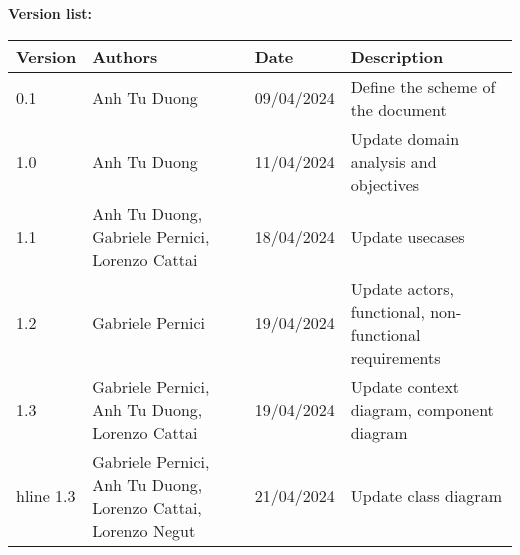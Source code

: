 \textcolor{RFIGreen}{\Large\bf Version list:}


\begin{center}

{\setlength{\extrarowheight}{6pt}
\begin{tabular}{|p{1.5cm}|p{4.5cm}|p{2.5cm}|p{5.5cm}|}
\hline
{\small\bf Version} & {\small\bf Authors} & {\small\bf Date} & {\small\bf Description}\\
\hline
0.1 & Anh Tu Duong & 09/04/2024  & Define the scheme of the document \\
\hline
1.0 & Anh Tu Duong & 11/04/2024  & Update domain analysis and objectives \\
\hline
1.1 & Anh Tu Duong, Gabriele Pernici, Lorenzo Cattai & 18/04/2024  & Update usecases \\
\hline
1.2 & Gabriele Pernici & 19/04/2024  & Update actors, functional, non-functional requirements \\
\hline
1.3 & Gabriele Pernici, Anh Tu Duong, Lorenzo Cattai & 19/04/2024  & Update context diagram, component diagram \\
hline
1.3 & Gabriele Pernici, Anh Tu Duong, Lorenzo Cattai, Lorenzo Negut & 21/04/2024  & Update class diagram \\
\end{tabular}
}

\end{center}

\newpage
